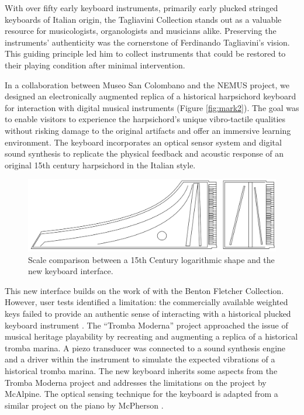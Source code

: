 With over fifty early keyboard instruments, primarily early plucked stringed keyboards of Italian origin, the Tagliavini Collection stands out as a valuable resource for musicologists, organologists and musicians alike. Preserving the instruments' authenticity was the cornerstone of Ferdinando Tagliavini’s vision. This guiding principle led him to collect instruments that could be restored to their playing condition after minimal intervention. 

In a collaboration between Museo San Colombano and the NEMUS project, we designed an electronically augmented replica of a historical harpsichord keyboard for interaction with digital musical instruments (Figure \ref{fig:mark2}). The goal was to enable visitors to experience the harpsichord’s unique vibro-tactile qualities without risking damage to the original artifacts and offer an immersive learning environment. The keyboard incorporates an optical sensor system and digital sound synthesis to replicate the physical feedback and acoustic response of an original 15th century harpsichord in the Italian style.

\begin{figure}
    \centering
    \includegraphics[width=1\linewidth]{img/comparison.png}
    \caption{Scale comparison between a 15th Century logarithmic shape and the new keyboard interface.}
    \label{fig:log-harp-comp}
\end{figure}\vfill
This new interface builds on the work of \textcite{mcalpine_sampling_2014} with the Benton Fletcher Collection. However, user tests identified a limitation: the commercially available weighted keys failed to provide an authentic sense of interacting with a historical plucked keyboard instrument \cite{mcalpine_sampling_2014}. The ``Tromba Moderna'' project \cite{baldwin_tromba_2016} approached the issue of musical heritage playability by recreating and augmenting a replica of a historical tromba marina. A piezo transducer was connected to a sound synthesis engine and a driver within the instrument to simulate the expected vibrations of a historical tromba marina. The new keyboard inherits some aspects from the Tromba Moderna project and addresses the limitations on the project by McAlpine. The optical sensing technique for the keyboard is adapted from a similar project on the piano by McPherson \cite{mcpherson_portable_2013}.

